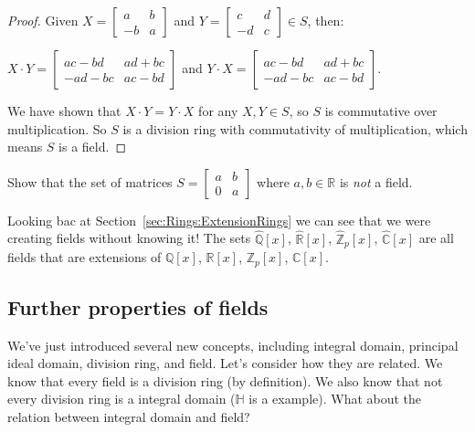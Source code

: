 \begin{example}{}
\begin{proof}
Given $X=
\begin{bmatrix}
a & b\\
-b & a
\end{bmatrix}$
and $Y=
\begin{bmatrix}
c & d\\
-d & c
\end{bmatrix}
\in S$, then: 

$X\cdot Y=
\begin{bmatrix}
ac-bd & ad+bc\\
-ad-bc & ac-bd
\end{bmatrix}$
and $Y\cdot X=
\begin{bmatrix}
ac-bd & ad+bc\\
-ad-bc & ac-bd
\end{bmatrix}. $

We have shown that $X\cdot Y=Y\cdot X$ for any $X,Y\in S$, so $S$ is commutative over multiplication.  So $S$ is a division ring with commutativity of multiplication, which means $S$ is a field.
\end{proof}
\end{example}

\begin{exercise}{}
Show that the set of matrices $S=
\begin{bmatrix}
a & b\\ 
0 & a 
\end{bmatrix}$
where $a,b\in {\mathbb R}$ is \emph{not} a field.
\end{exercise}

Looking bac at Section~\ref{sec:Rings:ExtensionRings} we can see that we were creating fields without knowing it!  The sets $\widehat{\mathbb{Q}}[x]$, 
$\widehat{\mathbb{R}}[x]$,
$\widehat{\mathbb{Z}}_p[x]$,
$\widehat{\mathbb{C}}[x]$
are all fields that are extensions of $\mathbb{Q}[x]$, 
$\mathbb{R}[x]$,
$\mathbb{Z}_p[x]$,
$\mathbb{C}[x]$. 

\subsection{Further properties of fields}
\label{subsec:Rings:IntegralDomainsPrincipalIdealDomains:FurtherProperties}

We've just introduced several new concepts, including integral domain, principal ideal domain, division ring, and field. Let's consider how they are related. We know that every field is a division ring (by definition). We also know that not every division ring is a integral domain (${\mathbb H}$ is a example). What about the relation between integral domain and field?

